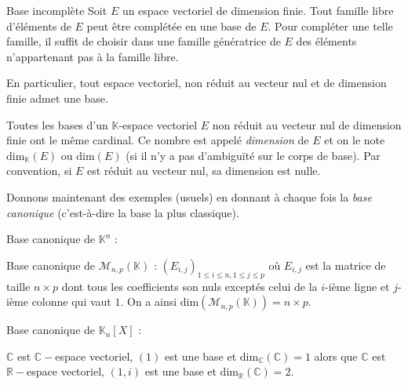 \documentclass[a4paper,10pt]{report}
\begin{document}
 
 \begin{Theoreme}{Base incomplète}\label{BaseInc}
 Soit $E$ un espace vectoriel de dimension finie. Tout famille libre d'éléments de $E$ peut être complétée en une base de $E$. Pour compléter une telle famille, il suffit de choisir dans une famille génératrice de $E$ des éléments n'appartenant pas à la famille libre.
 
 \medskip
 
En particulier, tout espace vectoriel, non réduit au vecteur nul et de dimension finie admet une base.
 \end{Theoreme}
% 
% 
 \begin{Theoreme}{} Toutes les bases d'un $\mathbb{K}$-espace vectoriel $E$ non réduit au vecteur nul de dimension finie ont le même cardinal. Ce nombre est appelé \emph{dimension} de $E$ et on le note $\textrm{dim}_{\mathbb{K}}(E)$ ou $\textrm{dim}(E)$ (si il n'y a pas d'ambiguïté sur le corps de base). Par convention, si $E$ est réduit au vecteur nul, sa dimension est nulle.
 \end{Theoreme}
 
\newpage
 
 Donnons maintenant des exemples (usuels) en donnant à chaque fois la \emph{base canonique} (c'est-à-dire la base la plus classique).
 
 \medskip
 
 \begin{exems}
 \item Base canonique de $\mathbb{K}^n$ : 
 
 \item Base canonique de $\mathcal{M}_{n,p}(\mathbb{K})$ : $(E_{i,j})_{1 \leq i \leq n, 1 \leq j \leq p}$ où $E_{i,j}$ est la matrice de taille $n \times p$ dont tous les coefficients son nuls exceptés celui de la $i$-ième ligne et $j$-ième colonne qui vaut $1$. On a ainsi $\textrm{dim}(\mathcal{M}_{n,p}(\mathbb{K}))=n \times p$.
 \item Base canonique de $\mathbb{K}_n[X]$ : 
 
 \item $\mathbb{C}$ est $\mathbb{C}-$espace vectoriel, $(1)$ est une base et $\textrm{dim}_{\mathbb{C}}(\mathbb{C})=1$ alors que $\mathbb{C}$ est $\mathbb{R}-$espace vectoriel, $(1,i)$ est une base et $\textrm{dim}_{\mathbb{R}}(\mathbb{C})=2$.
 \end{exems}
 
\end{document}
